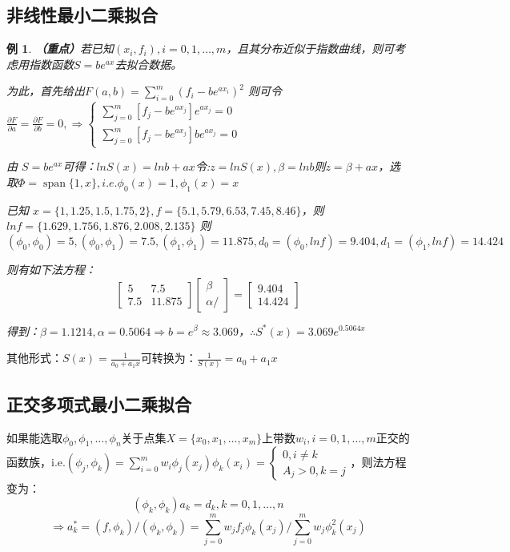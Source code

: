 \documentclass[a4paper]{article}
\newtheorem{example}{例}[section]
\DeclareMathOperator{\spn}{span}
\begin{document}
\subsection{非线性最小二乘拟合}
\begin{example}
    \textbf{（重点）}若已知$(x_i, f_i), i=0,1,\dots, m$，且其分布近似于指数曲线，则可考虑用指数函数$S=be^{ax}$去拟合数据。
    
    为此，首先给出$F(a,b)=\sum^m_{i=0} (f_i-be^{ax_i})^2 $
    则可令$\frac{\partial F}{\partial a} = \frac{\partial F}{\partial b}=0, \Rightarrow \left\{
    \begin{array}{lr}
        \sum^m_{j=0}[f_j-be^{ax_j}]e^{ax_j}=0 \\
        \sum^m_{j=0}[f_j-be^{ax_j}]be^{ax_j}=0
    \end{array}    
     \right. $
     
     由 $S=be^{ax} $可得：$lnS(x)=lnb+ax $令:$z=lnS(x), \beta=lnb$则$z=\beta + ax$，选取$\Phi = \spn\{1, x\}, i.e. \phi_0(x)=1, \phi_1(x)=x$

     已知 $x = \{1, 1.25, 1.5, 1.75, 2\}, f = \{5.1, 5.79, 6.53, 7.45, 8.46\}$，则$lnf =\{1.629, 1.756, 1.876, 2.008, 2.135\} $ 则
     $(\phi_0, \phi_0) = 5, (\phi_0, \phi_1) = 7.5, (\phi_1, \phi_1) = 11.875, d_0 = (\phi_0, lnf) = 9.404, d_1=(\phi_1, lnf) = 14.424$

     则有如下法方程：
     $$\left[
         \begin{matrix}
             5 & 7.5 \\
             7.5 & 11.875 
         \end{matrix}
         \right]\left[
             \begin{matrix}
                 \beta \\ \alpha /
             \end{matrix}
             \right]=
             \left[
                 \begin{matrix}
                     9.404 \\ 14.424
                 \end{matrix}
                 \right]$$
    
    得到：$\beta = 1.1214, \alpha = 0.5064 \Rightarrow b = e^\beta \approx 3.069$，$\therefore S^*(x)=3.069e^{0.5064x} $
\end{example}

其他形式：$S(x) = \frac{1}{a_0+a_1x}$可转换为：$\frac{1}{S(x)} = a_0+a_1x$

\subsection{正交多项式最小二乘拟合}
如果能选取$\phi_0, \phi_1, \dots, \phi_n$关于点集$X=\{x_0, x_1, \dots, x_m\}$上带数$w_i, i=0,1,\dots, m$正交的函数族，i.e.$(\phi_j, \phi_k)=\sum^m_{i=0}w_i\phi_j(x_j)\phi_k(x_i)=\left\{
    \begin{array}{lr}
        0, i\neq k \\
        A_j > 0 , k=j
    \end{array}
    \right. $，则法方程变为：
    $$(\phi_k, \phi_k)a_k = d_k, k=0,1,\dots, n$$
    $$\Rightarrow a^*_k=(f,\phi_k)/(\phi_k, \phi_k) = \sum^m_{j=0}w_jf_j\phi_k(x_j)/\sum^m_{j=0}w_j\phi_k^2(x_j) $$
\end{document}
